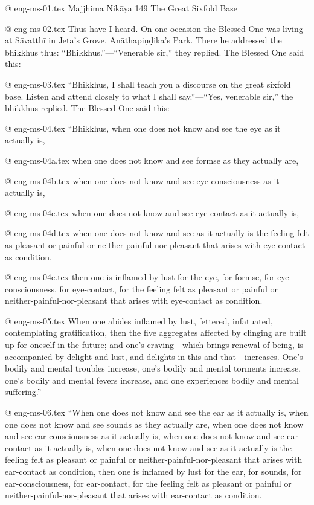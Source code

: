 @ eng-ms-01.tex
Majjhima Nikāya 149
The Great Sixfold Base

@ eng-ms-02.tex
Thus have I heard. On one occasion the Blessed One was living at Sāvatthī in Jeta’s Grove, Anāthapiṇḍika’s Park. There he addressed the bhikkhus thus: “Bhikkhus.”—“Venerable sir,” they replied. The Blessed One said this:

@ eng-ms-03.tex
“Bhikkhus, I shall teach you a discourse on the great sixfold base. Listen and attend closely to what I shall say.”—“Yes, venerable sir,” the bhikkhus replied. The Blessed One said this:

@ eng-ms-04.tex
“Bhikkhus, when one does not know and see the eye as it actually is,

@ eng-ms-04a.tex
when one does not know and see formse as they actually are,

@ eng-ms-04b.tex
when one does not know and see eye-consciousness as it actually is,

@ eng-ms-04c.tex
when one does not know and see eye-contact as it actually is,

@ eng-ms-04d.tex
when one does not know and see as it actually is the feeling felt as pleasant or painful or neither-painful-nor-pleasant that arises with eye-contact as condition,

@ eng-ms-04e.tex
then one is inflamed by lust for the eye, for formse, for eye-consciousness, for eye-contact, for the feeling felt as pleasant or painful or neither-painful-nor-pleasant that arises with eye-contact as condition.

@ eng-ms-05.tex
When one abides inflamed by lust, fettered, infatuated, contemplating gratification, then the five aggregates affected by clinging are built up for oneself in the future; and one’s craving—which brings renewal of being, is accompanied by delight and lust, and delights in this and that—increases. One’s bodily and mental troubles increase, one’s bodily and mental torments increase, one’s bodily and mental fevers increase, and one experiences bodily and mental suffering.”

@ eng-ms-06.tex
“When one does not know and see the ear as it actually is, when one does not know and see sounds as they actually are, when one does not know and see ear-consciousness as it actually is, when one does not know and see ear-contact as it actually is, when one does not know and see as it actually is the feeling felt as pleasant or painful or neither-painful-nor-pleasant that arises with ear-contact as condition, then one is inflamed by lust for the ear, for sounds, for ear-consciousness, for ear-contact, for the feeling felt as pleasant or painful or neither-painful-nor-pleasant that arises with ear-contact as condition.

